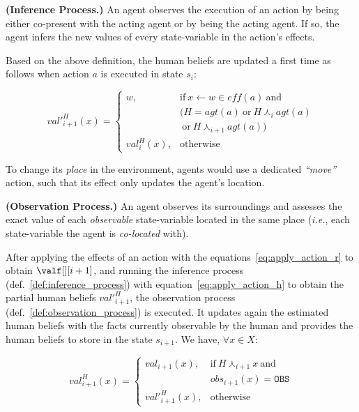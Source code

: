 \begin{definition} \label{def:inference_process}
    \textbf{(Inference Process.)} An agent observes the execution of an action by being either co-present with the acting agent 
    or by being the acting agent. If so, the agent infers the new values of every state-variable in the action's effects.
\end{definition}

Based on the above definition, the human beliefs are updated a first time as follows when action $a$ is executed in state $s_i$:

\begin{equation} \label{eq:apply_action_h}
val'^H_{i+1}(x) = \left\{ 
\begin{array}{ll}
    w, & \mbox{if} ~ x \leftarrow w \in \textit{eff}(a) ~ \mbox{and}  \\ 
    & (H = \textit{agt}(a) ~\mbox{or}~ H \curlywedge_i \textit{agt}(a)\\
    & ~\mbox{or}~ H \curlywedge_{i+1} \textit{agt}(a))\\
    val^H_i(x), & \mbox{otherwise}
\end{array}\right.
\end{equation}

To change its \textit{place} in the environment, agents would use a dedicated \textit{``move''} action, such that its effect only updates the agent's location. 

\begin{definition} \label{def:observation_process}
    \textbf{(Observation Process.)} An agent observes its surroundings and assesses the exact value of each \emph{observable} state-variable located in the same place (\textit{i.e.}, each state-variable the agent is \emph{co-located} with).
\end{definition}

After applying the effects of an action with the equations~\ref{eq:apply_action_r} to obtain $\valf[][i+1]$, and running the inference process (def.~\ref{def:inference_process}) with equation~\ref{eq:apply_action_h} to obtain the partial human beliefs $val'^H_{i+1}$, the observation process (def.~\ref{def:observation_process}) is executed. It updates again the estimated human beliefs with the facts currently observable by the human and provides the human beliefs to store in the state $s_{i+1}$. We have, $\forall x \in X$:

\begin{equation}
val^H_{i+1}(x) = \left\{ 
\begin{array}{ll}
val_{i+1}(x), & \mbox{if}~ H \curlywedge_{i+1} x ~\mbox{and}~ \\
    & obs_{i+1}(x) = \texttt{OBS}\\
val'^H_{i+1}(x), & \mbox{otherwise}
\end{array}\right.
\end{equation}

